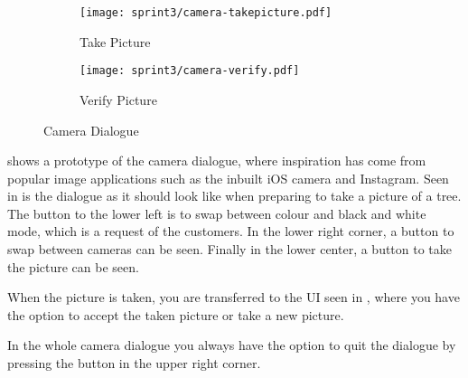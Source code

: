 \begin{figure}[h]
     \centering
     \begin{subfigure}{0.45\textwidth}
          \texttt{[image: sprint3/camera-takepicture.pdf]}
          \caption{Take Picture}
          \label{fig:cam-takepic}
     \end{subfigure}      
     \begin{subfigure}{0.45\textwidth}
          \texttt{[image: sprint3/camera-verify.pdf]}
          \caption{Verify Picture}
          \label{fig:cam-verifypic}
     \end{subfigure}
     \caption{Camera Dialogue}
     \label{fig:cam-dialogue}
\end{figure}

 shows a prototype of the camera dialogue, where inspiration has come from popular image applications such as the inbuilt iOS camera and Instagram.
Seen in  is the dialogue as it should look like when preparing to take a picture of a tree.
The button to the lower left is to swap between colour and black and white mode, which is a request of the customers.
In the lower right corner, a button to swap between cameras can be seen.
Finally in the lower center, a button to take the picture can be seen.

When the picture is taken, you are transferred to the UI seen in , where you have the option to accept the taken picture or take a new picture.

In the whole camera dialogue you always have the option to quit the dialogue by pressing the button in the upper right corner.